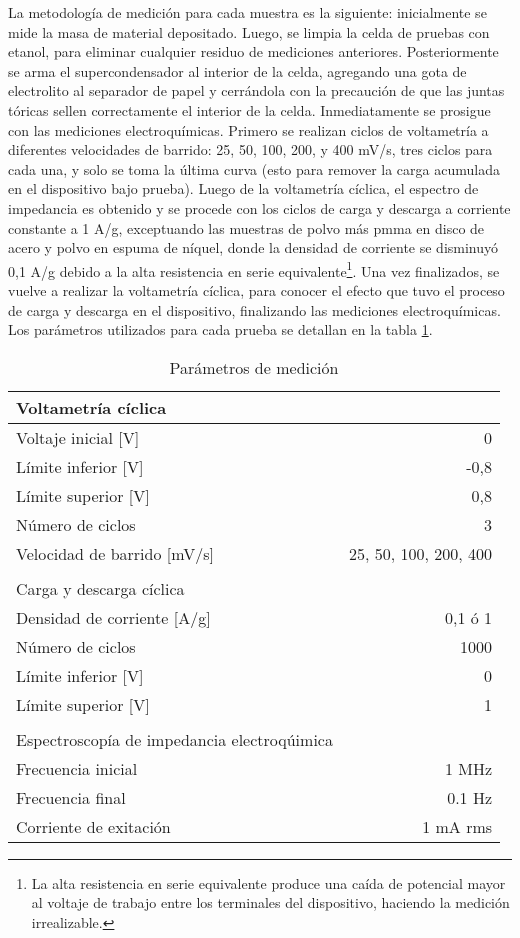 La metodología de medición para cada muestra es la siguiente: inicialmente se mide la masa de material depositado. Luego, se limpia la celda de pruebas con etanol, para eliminar cualquier residuo de mediciones anteriores. Posteriormente se arma el supercondensador al interior de la celda, agregando una gota de electrolito al separador de papel y cerrándola con la precaución de que las juntas tóricas sellen correctamente el interior de la celda. Inmediatamente se prosigue con las mediciones electroquímicas. Primero se realizan ciclos de voltametría a diferentes velocidades de barrido: 25, 50, 100, 200, y 400 mV/s, tres ciclos para cada una, y solo se toma la última curva (esto para remover la carga acumulada en el dispositivo bajo prueba).  Luego de la voltametría cíclica, el espectro de impedancia es obtenido y se procede con los ciclos de carga y descarga a corriente constante a 1 A/g, exceptuando las muestras de polvo más pmma en disco de acero y polvo en espuma de níquel, donde la densidad de corriente se disminuyó 0,1 A/g debido a la alta resistencia en serie equivalente\footnote{La alta resistencia en serie equivalente produce una caída de potencial mayor al voltaje de trabajo entre los terminales del dispositivo, haciendo la medición irrealizable. }. Una vez finalizados, se vuelve a realizar la voltametría cíclica, para conocer el efecto que tuvo el proceso de carga y descarga en el dispositivo, finalizando las mediciones electroquímicas. Los parámetros utilizados para cada prueba se detallan en la tabla \ref{tab:elec_config}.


\begin{table}[h!]
	\centering
	\caption{Parámetros de medición}
	\begin{tabular}{ l r }
		Voltametría cíclica &  \\
		\hline
		Voltaje inicial [V] & 0 \\
		Límite inferior [V] & -0,8 \\
		Límite superior [V] & 0,8  \\
		Número de ciclos & 3 \\
		Velocidad de barrido [mV/s] & 25, 50, 100, 200, 400 \\
		& \\
		Carga y descarga cíclica & \\
		\hline
		Densidad de corriente [A/g] & 0,1 ó 	1 \\
		Número de ciclos & 1000 \\
		Límite inferior [V] & 0 \\
		Límite superior [V] & 1 \\
		& \\
		Espectroscopía de impedancia electroqúimica & \\
		\hline
		Frecuencia inicial	&	1 MHz \\
		Frecuencia final	&	0.1 Hz \\
		Corriente de exitación & 1 mA rms \\ 
	\end{tabular}
	\label{tab:elec_config}
\end{table}

